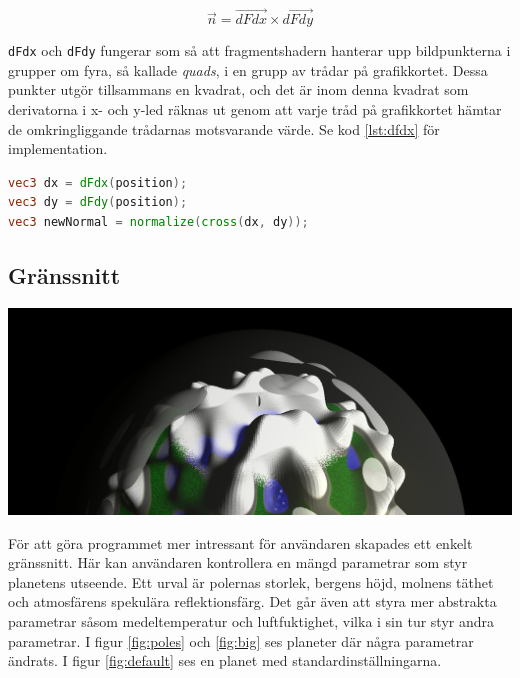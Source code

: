 \documentclass[conference]{IEEEtran}
\newenvironment{Figure}
  {\par\medskip\noindent\minipage{\linewidth}}
  {\endminipage\par\medskip}
\begin{document}
\begin{equation}
  \overrightarrow{n} = \overrightarrow{dFdx} \times \overrightarrow{dFdy}
  \label{eq:normal}
\end{equation}

\texttt{dFdx} och \texttt{dFdy} fungerar som så att fragmentshadern hanterar upp bildpunkterna i grupper om fyra, så kallade \emph{quads}, i en grupp av trådar på grafikkortet. Dessa punkter utgör tillsammans en kvadrat, och det är inom denna kvadrat som derivatorna i x- och y-led räknas ut genom att varje tråd på grafikkortet hämtar de omkringliggande trådarnas motsvarande värde. Se kod \ref{lst:dfdx} för implementation. \cite{ref:dfdx}

\begin{lstlisting}[language=GLSL,caption=Uträkning av ny normal (GLSL),label={lst:dfdx}]
vec3 dx = dFdx(position);
vec3 dy = dFdy(position);
vec3 newNormal = normalize(cross(dx, dy));
\end{lstlisting}

\subsection{Gränssnitt}

\begin{Figure}
  \centering
    \includegraphics[width=0.9\linewidth]{./images/poles}
  \label{fig:poles}
\end{Figure}

För att göra programmet mer intressant för användaren skapades ett enkelt gränssnitt. Här kan användaren kontrollera en mängd parametrar som styr planetens utseende. Ett urval är polernas storlek, bergens höjd, molnens täthet och atmosfärens spekulära reflektionsfärg. Det går även att styra mer abstrakta parametrar såsom medeltemperatur och luftfuktighet, vilka i sin tur styr andra parametrar. I figur \ref{fig:poles} och \ref{fig:big} ses planeter där några parametrar ändrats. I figur \ref{fig:default} ses en planet med standardinställningarna.
\end{document}
